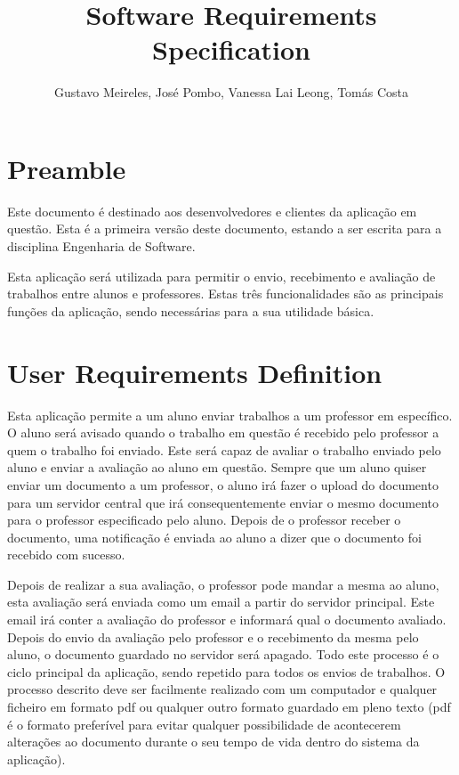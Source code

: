 \documentclass[10pt]{article}
\author{Gustavo Meireles, José Pombo, Vanessa Lai Leong, Tomás Costa}
\title{Software Requirements Specification}
\begin{document}
\maketitle

\section{Preamble}
Este documento é destinado aos desenvolvedores e clientes da aplicação 
em questão. Esta é a primeira versão deste documento, estando a ser 
escrita para a disciplina Engenharia de Software. 

Esta aplicação será utilizada para permitir o envio, recebimento e 
avaliação de trabalhos entre alunos e professores. 
Estas três funcionalidades são as principais funções da aplicação, 
sendo necessárias para a sua utilidade básica.

\newpage

\tableofcontents{}

\newpage

\section{User Requirements Definition}
Esta aplicação permite a um aluno enviar trabalhos a um professor 
em específico. O aluno será avisado quando o trabalho em questão 
é recebido pelo professor a quem o trabalho foi enviado. 
Este será capaz de avaliar o trabalho enviado pelo aluno e 
enviar a avaliação ao aluno em questão. Sempre que um aluno 
quiser enviar um documento a um professor, o aluno irá fazer o 
upload do documento para um servidor central que irá consequentemente 
enviar o mesmo documento para o professor especificado pelo aluno. 
Depois de o professor receber o documento, uma notificação é enviada ao 
aluno a dizer que o documento foi recebido com sucesso. 

Depois de realizar a sua avaliação, o professor pode mandar a mesma 
ao aluno, esta avaliação será enviada como um email a partir do 
servidor principal. Este email irá conter a avaliação do professor e 
informará qual o documento avaliado. Depois do envio da avaliação pelo 
professor e o recebimento da mesma pelo aluno, o documento 
guardado no servidor será apagado. Todo este processo é o ciclo 
principal da aplicação, sendo repetido para todos os envios de trabalhos. 
O processo descrito deve ser facilmente realizado com um 
computador e qualquer ficheiro em formato pdf ou qualquer outro
formato guardado em pleno texto (pdf é o formato 
preferível para evitar qualquer possibilidade de acontecerem 
alterações ao documento durante o seu tempo de vida dentro 
do sistema da aplicação).
\end{document}
